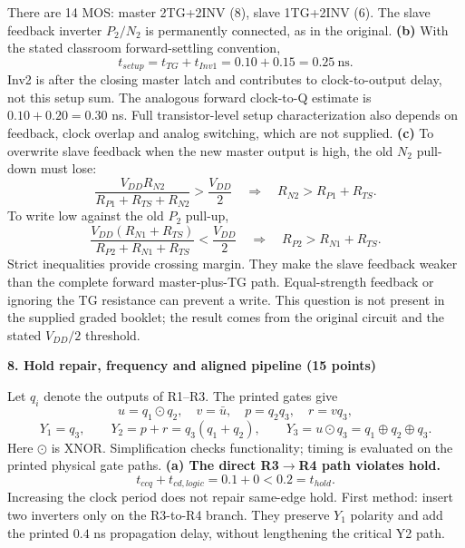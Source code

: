 \documentclass[10pt]{article}
\newcommand{\qheading}[1]{\par\medskip\textbf{#1}\par}
\begin{document}
There are 14 MOS: master 2TG+2INV (8), slave 1TG+2INV (6). The slave feedback inverter $P_2/N_2$ is permanently connected, as in the original.
\textbf{(b)} With the stated classroom forward-settling convention,
\[\boxed{t_{setup}=t_{TG}+t_{Inv1}=0.10+0.15=0.25\ \mathrm{ns}.}\]
Inv2 is after the closing master latch and contributes to clock-to-output delay, not this setup sum. The analogous forward clock-to-Q estimate is $0.10+0.20=0.30$ ns. Full transistor-level setup characterization also depends on feedback, clock overlap and analog switching, which are not supplied.
\textbf{(c)} To overwrite slave feedback when the new master output is high, the old $N_2$ pull-down must lose:
\[\frac{V_{DD}R_{N2}}{R_{P1}+R_{TS}+R_{N2}}>\frac{V_{DD}}2
\quad\Longrightarrow\quad\boxed{R_{N2}>R_{P1}+R_{TS}.}\]
To write low against the old $P_2$ pull-up,
\[\frac{V_{DD}(R_{N1}+R_{TS})}{R_{P2}+R_{N1}+R_{TS}}<\frac{V_{DD}}2
\quad\Longrightarrow\quad\boxed{R_{P2}>R_{N1}+R_{TS}.}\]
Strict inequalities provide crossing margin. They make the slave feedback weaker than the complete forward master-plus-TG path. Equal-strength feedback or ignoring the TG resistance can prevent a write. This question is not present in the supplied graded booklet; the result comes from the original circuit and the stated $V_{DD}/2$ threshold.
\newpage
\qheading{8. Hold repair, frequency and aligned pipeline (15 points)}
Let $q_i$ denote the outputs of R1--R3. The printed gates give
\[u=q_1\odot q_2,\quad v=\bar u,\quad p=q_2q_3,\quad r=vq_3,\]
\[Y_1=q_3,\qquad Y_2=p+r=q_3(q_1+q_2),\qquad Y_3=u\odot q_3=q_1\oplus q_2\oplus q_3.\]
Here $\odot$ is XNOR. Simplification checks functionality; timing is evaluated on the printed physical gate paths.
\textbf{(a) The direct R3$\to$R4 path violates hold.}
\[t_{ccq}+t_{cd,logic}=0.1+0<0.2=t_{hold}.\]
Increasing the clock period does not repair same-edge hold. First method: insert two inverters only on the R3-to-R4 branch. They preserve $Y_1$ polarity and add the printed $0.4$ ns propagation delay, without lengthening the critical Y2 path.
\end{document}
